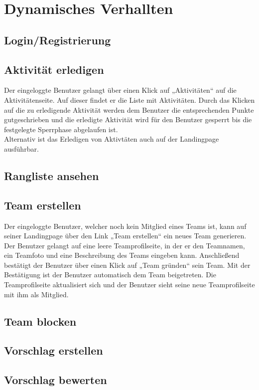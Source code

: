 \section{Dynamisches Verhallten}
\subsection{Login/Registrierung}
\subsection{Aktivität erledigen}
Der eingeloggte Benutzer gelangt über einen Klick auf „Aktivitäten“ auf die Aktivitätenseite. Auf dieser findet er die Liste mit Aktivitäten. Durch das Klicken auf die zu erledigende Aktivität werden dem Benutzer die entsprechenden Punkte gutgeschrieben und die erledigte Aktivität wird für den Benutzer gesperrt bis die festgelegte Sperrphase abgelaufen ist.\\
Alternativ ist das Erledigen von Aktivtäten auch auf der Landingpage ausführbar.\\
\subsection{Rangliste ansehen}
\subsection{Team erstellen}
Der eingeloggte Benutzer, welcher noch kein Mitglied eines Teams ist, kann auf seiner Landingpage über den Link „Team erstellen“ ein neues Team generieren. Der Benutzer gelangt auf eine leere Teamprofilseite, in der er den Teamnamen, ein Teamfoto und eine Beschreibung des Teams eingeben kann. Anschließend bestätigt der Benutzer über einen Klick auf „Team gründen“ sein Team. Mit der Bestätigung ist der Benutzer automatisch dem Team beigetreten. Die Teamprofilseite aktualisiert sich und der Benutzer sieht seine neue Teamprofilseite mit ihm als Mitglied.\\
\subsection{Team blocken}
\subsection{Vorschlag erstellen}
\subsection{Vorschlag bewerten}
